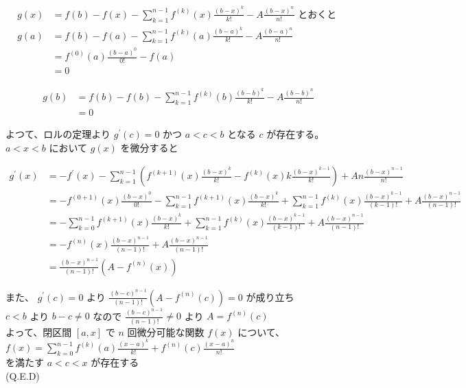 \documentclass[10pt]{article}
\begin{document}
$$
\begin{aligned}
g(x) & =f(b)-f(x)-\sum_{k=1}^{n-1} f^{(k)}(x) \frac{(b-x)^{k}}{k!}-A \frac{(b-x)^{n}}{n!} \text { とおくと } \\
g(a) & =f(b)-f(a)-\sum_{k=1}^{n-1} f^{(k)}(a) \frac{(b-a)^{k}}{k!}-A \frac{(b-a)^{n}}{n!} \\
& =f^{(0)}(a) \frac{(b-a)^{0}}{0!}-f(a) \\
& =0
\end{aligned}
$$

$$
\begin{aligned}
g(b) & =f(b)-f(b)-\sum_{k=1}^{n-1} f^{(k)}(b) \frac{(b-b)^{k}}{k!}-A \frac{(b-b)^{n}}{n!} \\
& =0
\end{aligned}
$$

よつて、ロルの定理より $g^{\prime}(c)=0$ かつ $a<c<b$ となる $c$ が存在する。\\
$a<x<b$ において $g(x)$ を微分すると

$$
\begin{aligned}
g^{\prime}(x) & =-f^{\prime}(x)-\sum_{k=1}^{n-1}\left(f^{(k+1)}(x) \frac{(b-x)^{k}}{k!}-f^{(k)}(x) k \frac{(b-x)^{k-1}}{k!}\right)+A n \frac{(b-x)^{n-1}}{n!} \\
& =-f^{(0+1)}(x) \frac{(b-x)^{0}}{0!}-\sum_{k=1}^{n-1} f^{(k+1)}(x) \frac{(b-x)^{k}}{k!}+\sum_{k=1}^{n-1} f^{(k)}(x) \frac{(b-x)^{k-1}}{(k-1)!}+A \frac{(b-x)^{n-1}}{(n-1)!} \\
& =-\sum_{k=0}^{n-1} f^{(k+1)}(x) \frac{(b-x)^{k}}{k!}+\sum_{k=1}^{n-1} f^{(k)}(x) \frac{(b-x)^{k-1}}{(k-1)!}+A \frac{(b-x)^{n-1}}{(n-1)!} \\
& =-f^{(n)}(x) \frac{(b-x)^{n-1}}{(n-1)!}+A \frac{(b-x)^{n-1}}{(n-1)!} \\
& =\frac{(b-x)^{n-1}}{(n-1)!}\left(A-f^{(n)}(x)\right)
\end{aligned}
$$

また、 $g^{\prime}(c)=0$ より $\frac{(b-c)^{n-1}}{(n-1)!}\left(A-f^{(n)}(c)\right)=0$ が成り立ち\\
$c<b$ より $b-c \neq 0$ なので $\frac{(b-c)^{n-1}}{(n-1)!} \neq 0$ より $A=f^{(n)}(c)$\\
よって、閉区間 $[a, x]$ で $n$ 回微分可能な関数 $f(x)$ について、\\
$f(x)=\sum_{k=0}^{n-1} f^{(k)}(a) \frac{(x-a)^{k}}{k!}+f^{(n)}(c) \frac{(x-a)^{n}}{n!}$\\
を満たす $a<c<x$ が存在する\\
(Q.E.D)
\end{document}
